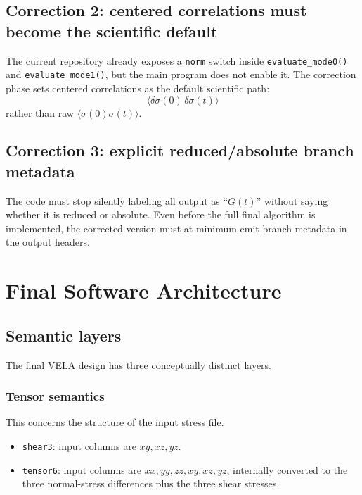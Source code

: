 \documentclass[11pt]{article}
\begin{document}
\subsection{Correction 2: centered correlations must become the scientific default}

The current repository already exposes a \texttt{norm} switch inside \texttt{evaluate\_mode0()} and \texttt{evaluate\_mode1()}, but the main program does not enable it. The correction phase sets centered correlations as the default scientific path:
\begin{equation}
\langle \delta \sigma(0)\,\delta \sigma(t)\rangle
\end{equation}
rather than raw $\langle \sigma(0)\sigma(t)\rangle$.

\subsection{Correction 3: explicit reduced/absolute branch metadata}

The code must stop silently labeling all output as ``$G(t)$'' without saying whether it is reduced or absolute. Even before the full final algorithm is implemented, the corrected version must at minimum emit branch metadata in the output headers.

\section{Final Software Architecture}

\subsection{Semantic layers}

The final VELA design has three conceptually distinct layers.

\subsubsection*{Tensor semantics}
This concerns the structure of the input stress file.
\begin{itemize}[leftmargin=2em]
  \item \texttt{shear3}: input columns are $xy,xz,yz$.
  \item \texttt{tensor6}: input columns are $xx,yy,zz,xy,xz,yz$, internally converted to the three normal-stress differences plus the three shear stresses.
\end{itemize}
\end{document}
